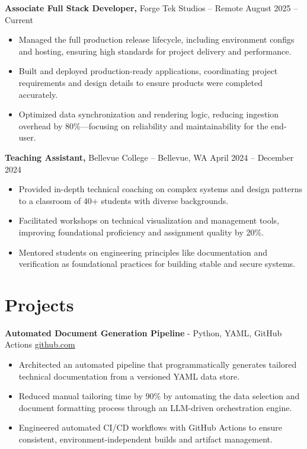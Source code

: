 \documentclass[11pt]{article}       %
\begin{document}
\textbf{Associate Full Stack Developer,} {Forge Tek Studios} -- Remote \hfill August 2025 -- Current 
\vspace{-9pt}
\begin{itemize}
  \item Managed the full production release lifecycle, including environment configs and hosting, ensuring high standards for project delivery and performance.
  \item Built and deployed production-ready applications, coordinating project requirements and design details to ensure products were completed accurately.
  \item Optimized data synchronization and rendering logic, reducing ingestion overhead by 80\%—focusing on reliability and maintainability for the end-user.
\end{itemize}

\textbf{Teaching Assistant,} {Bellevue College} -- Bellevue, WA \hfill April 2024 -- December 2024 \\
\vspace{-9pt}
\begin{itemize}
  \item Provided in-depth technical coaching on complex systems and design patterns to a classroom of 40+ students with diverse backgrounds.
  \item Facilitated workshops on technical visualization and management tools, improving foundational proficiency and assignment quality by 20\%.
  \item Mentored students on engineering principles like documentation and verification as foundational practices for building stable and secure systems.
\end{itemize}

\vspace{-18.5pt}

\section*{Projects}

\textbf{Automated Document Generation Pipeline}{ - Python, YAML, GitHub Actions} \hfill \href{https://github.com/Monica20030707/Tex_OrangeLeaf-mcp}{github.com} \\
\vspace{-9pt}
\begin{itemize}
  \item Architected an automated pipeline that programmatically generates tailored technical documentation from a versioned YAML data store.
  \item Reduced manual tailoring time by 90\% by automating the data selection and document formatting process through an LLM-driven orchestration engine.
  \item Engineered automated CI/CD workflows with GitHub Actions to ensure consistent, environment-independent builds and artifact management.
\end{itemize}
\end{document}
